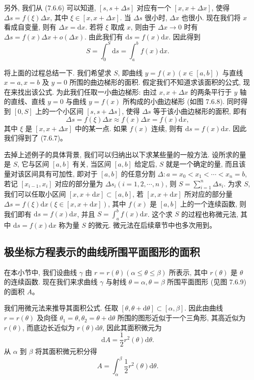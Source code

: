 \documentclass[UTF8, 12pt, fontset=fandol, oneside]{ctexart}
\begin{document}
另外, 我们从 (7.6.6) 可以知道, $[s,s+\Delta s]$ 对应有一个 $[x,x+\Delta x]$, 使得 $\Delta s=f(\xi)\Delta x$, 其中 $\xi\in[x,x+\Delta x]$. 当 $\Delta s$ 很小时, $\Delta x$ 也很小. 现在我们将 $x$ 看成自变量, 则有 $\Delta x=\mathrm dx$. 若将 $\xi$ 取成 $x$, 则由于 $\Delta x\to0$ 时有 $\Delta s=f(x)\Delta x+o(\Delta x)$. 由此我们有 $\mathrm ds=f(x)\mathrm dx$. 因此得到
\begin{equation}
  S=\int_0^S\mathrm ds=\int_a^b f(x)\mathrm dx.
  \tag{7.6.7}
\end{equation}

将上面的过程总结一下. 我们希望求 $S$, 即曲线 $y=f(x)(x\in[a,b])$ 与直线 $x=a,x=b$ 及 $y=0$ 所围的曲边梯形的面积. 假定我们不知道求该面积的公式, 现在来找出该公式. 为此我们任取一小曲边梯形: 由过 $x,x+\Delta x$ 的两条平行于 $y$ 轴的直线、直线 $y=0$ 与曲线 $y=f(x)$ 所构成的小曲边梯形 (如图 7.6.8). 同时得到 $[0,S]$ 上的一个小区间 $[s,s+\Delta s]$, 使得 $\Delta s$ 等于该小曲边梯形的面积, 即有
\[
  \Delta s=f(\xi)\Delta x\approx f(x)\Delta x=f(x)\mathrm dx,
\]
其中 $\xi$ 是 $[x,x+\Delta x]$ 中的某一点. 如果 $f(x)$ 连续, 则有 $\mathrm ds=f(x)\mathrm dx$. 因此我们得到了 (7.6.7)。

去掉上述例子的具体背景, 我们可以归纳出以下求某些量的一般方法. 设所求的量是 $S$, 它与区间 $[a,b]$ 有关, 当区间 $[a,b]$ 给定后, $S$ 就是一个确定的量, 而且该量对该区间具有可加性, 即对于 $[a,b]$ 的任意分割 $\Delta:a=x_0<x_1<\cdots<x_n=b$, 若记 $[x_{i-1},x_i]$ 对应的部分量为 $\Delta s_i(i=1,2,\cdots,n)$, 则 $S=\sum_{i=1}^n\Delta s_i$. 为求 $S$, 我们可以任取小区间 $[x,x+\mathrm dx]\subset[a,b]$, 若 $[x,x+\mathrm dx]$ 所对应的部分量 $\Delta s=f(\xi)\mathrm dx(\xi\in[x,x+\mathrm dx])$, 其中 $f(x)$ 是 $[a,b]$ 上的一个连续函数, 则我们即有 $\mathrm ds=f(x)\mathrm dx$, 并且 $S=\int_a^b f(x)\mathrm dx$. 这个求 $S$ 的过程也称微元法, 其中 $\mathrm ds=f(x)\mathrm dx$ 称为量 $S$ 的微元. 微元法在后续章节中也多次用到。

\subsection{极坐标方程表示的曲线所围平面图形的面积}

在本小节中, 我们设曲线 $\gamma$ 由 $r=r(\theta)(\alpha\leq\theta\leq\beta)$ 所表示, 其中 $r(\theta)$ 是 $\theta$ 的连续函数. 现在我们来求曲线 $\gamma$ 与射线 $\theta=\alpha,\theta=\beta$ 所围平面图形 (见图 7.6.9) 的面积 $A$。

我们用微元法来推导其面积公式. 任取 $[\theta,\theta+\mathrm d\theta]\subset[\alpha,\beta]$. 因此由曲线 $r=r(\theta)$ 及向径 $\theta_1=\theta,\theta_2=\theta+\mathrm d\theta$ 所围的图形近似于一个三角形, 其高近似为 $r(\theta)$, 而底边长近似为 $r(\theta)\mathrm d\theta$, 因此其面积微元为
\[
  \mathrm dA=\frac{1}{2}r^2(\theta)\mathrm d\theta.
\]
从 $\alpha$ 到 $\beta$ 将其面积微元积分得
\[
  A=\int_\alpha^\beta\frac{1}{2}r^2(\theta)\mathrm d\theta.
\]
\end{document}

